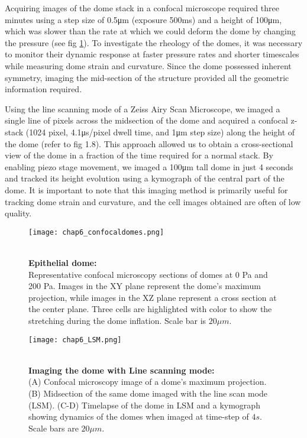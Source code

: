 Acquiring images of the dome stack in a confocal microscope required three minutes using a step size of 0.5\unit{\um} (exposure 500\unit{\ms}) and a height of 100\unit{\um}, which was slower than the rate at which we could deform the dome by changing the pressure (see fig \ref{fig_6_6}). To investigate the rheology of the domes, it was necessary to monitor their dynamic response at faster pressure rates and shorter timescales while measuring dome strain and curvature. Since the dome possessed inherent symmetry, imaging the mid-section of the structure provided all the geometric information required.

Using the line scanning mode of a Zeiss Airy Scan Microscope, we imaged a single line of pixels across the midsection of the dome and acquired a confocal z-stack (1024 pixel, 4.1\unit{\us/pixel} dwell time, and 1\unit{\um} step size) along the height of the dome (refer to fig 1.8). This approach allowed us to obtain a cross-sectional view of the dome in a fraction of the time required for a normal stack. By enabling piezo stage movement, we imaged a 100\unit{\um} tall dome in just 4 seconds and tracked its height evolution using a kymograph of the central part of the dome. It is important to note that this imaging method is primarily useful for tracking dome strain and curvature, and the cell images obtained are often of low quality.

\begin{figure}[t]
	\begin{minipage}[c]{0.6\textwidth}
		\texttt{[image: chap6\_confocaldomes.png]}
	\end{minipage}\hfill
	\begin{minipage}[c]{0.35\textwidth}
		\caption{\\ \textbf{Epithelial dome:}\\ Representative confocal microscopy sections of domes at 0 Pa and 200 Pa. Images in the XY plane represent the dome's maximum projection, while images in the XZ plane represent a cross section at the center plane. Three cells are highlighted with color to show the stretching during the dome inflation. Scale bar is $20 \mu m$.
		} \label{fig_6_6}
	\end{minipage}
\end{figure}

\begin{figure}[]
	\begin{minipage}[c]{0.6\textwidth}
		\texttt{[image: chap6\_LSM.png]}
	\end{minipage}\hfill
	\begin{minipage}[c]{0.35\textwidth}
		\caption{\\ \textbf{Imaging the dome with Line scanning mode:}\\ (A) Confocal microscopy image of a dome's maximum projection. (B) Midsection of the same dome imaged with the line scan mode (LSM). (C-D) Timelapse of the dome in LSM and a kymograph showing dynamics of the domes when imaged at time-step of $4s$. Scale bars are $20 \mu m$.
		} \label{fig_6_7}
	\end{minipage}
\end{figure}

